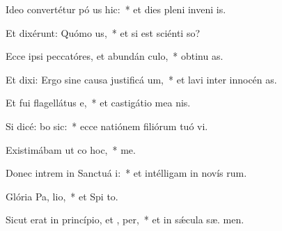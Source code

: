 \item Ideo convertétur pó us hic:~* et dies pleni inveni  is.
\item Et dixérunt: Quómo  us,~* et si est sciénti  so?
\item Ecce ipsi peccatóres, et abundán  culo,~* obtinu as.
\item Et dixi: Ergo sine causa justificá  um,~* et lavi inter innocén  as.
\item Et fui flagellátus  e,~* et castigátio mea  nis.
\item Si dicé: bo sic:~* ecce natiónem filiórum tuó vi.
\item Existimábam ut co hoc,~*    me.
\item Donec intrem in Sanctuá i:~* et intélligam in novís rum.
\item Glória Pa,  lio,~* et Spi to.
\item Sicut erat in princípio, et ,  per,~* et in sǽcula sæ. men.
